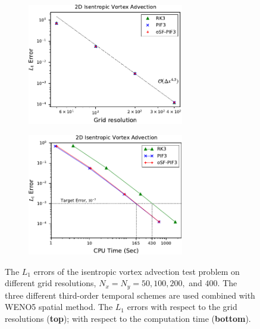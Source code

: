 \begin{figure}
    \centering
    \begin{subfigure}{\textwidth}
        \centering
        \includegraphics[width=0.75\textwidth]{fig/vortex_third}
    \end{subfigure}
    \par\bigskip
    \begin{subfigure}{\textwidth}
        \centering
        \includegraphics[width=0.75\textwidth]{fig/vortex_time_third}
    \end{subfigure}
    \caption{The \( L_{1} \) errors of the isentropic vortex advection test problem
        on different grid resolutions, \( N_{x} = N_{y} = 50, 100, 200, \) and \( 400 \).
        The three different third-order temporal schemes
        are used combined with WENO5 spatial method.
        The \( L_{1} \) errors
        with respect to the grid resolutions (\textbf{top});
        with respect to the computation time (\textbf{bottom}).
    }\label{fig:vortex_third}
\end{figure}

